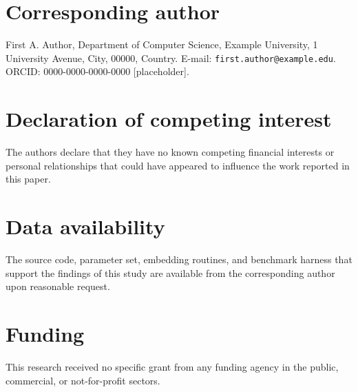 \documentclass[preprint,12pt]{elsarticle}
\begin{document}
\section*{Corresponding author}

First A. Author, Department of Computer Science, Example University,
1 University Avenue, City, 00000, Country. E-mail:
\texttt{first.author@example.edu}. ORCID: 0000-0000-0000-0000 [placeholder].

\section*{Declaration of competing interest}

The authors declare that they have no known competing financial interests or
personal relationships that could have appeared to influence the work reported
in this paper.

\section*{Data availability}

The source code, parameter set, embedding routines, and benchmark harness that
support the findings of this study are available from the corresponding author
upon reasonable request.

\section*{Funding}

This research received no specific grant from any funding agency in the public,
commercial, or not-for-profit sectors.
\end{document}
